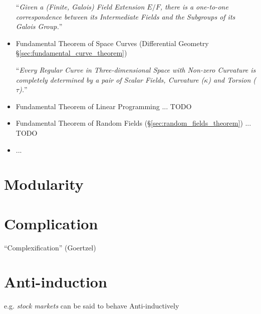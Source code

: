 \begin{itemize}
    ``\emph{Given a (Finite, Galois) Field Extension $E/F$, there is a
    one-to-one correspondence between its Intermediate Fields and the Subgroups
    of its Galois Group.}''

  \item Fundamental Theorem of Space Curves
    (Differential Geometry \S\ref{sec:fundamental_curve_theorem})

    ``\emph{Every Regular Curve in Three-dimensional Space with Non-zero
    Curvature is completely determined by a pair of Scalar Fields, Curvature
    ($\kappa$) and Torsion ($\tau$).}''

  \item Fundamental Theorem of Linear Programming ... TODO

  \item Fundamental Theorem of Random Fields (\S\ref{sec:random_fields_theorem})
    ... TODO
  \item ...
\end{itemize}



\section{Modularity}\label{sec:modularity}

\section{Complication}\label{sec:complication}

``Complexification'' (Goertzel)



\section{Anti-induction}\label{sec:anti_induction}

e.g. \emph{stock markets} can be said to behave Anti-inductively
